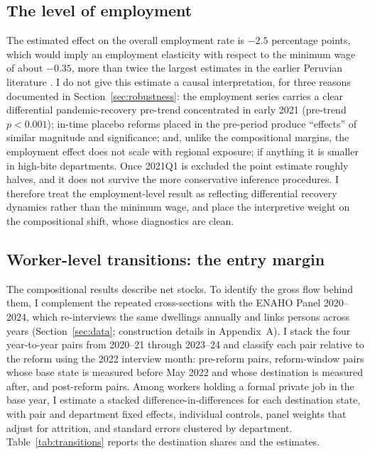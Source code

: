 \subsection{The level of employment}

The estimated effect on the overall employment rate is $-2.5$ percentage points, which
would imply an employment elasticity with respect to the minimum wage of about $-0.35$,
more than twice the largest estimates in the earlier Peruvian literature
\citep{cespedes_2005}. I do not give this estimate a causal interpretation, for three
reasons documented in Section~\ref{sec:robustness}: the employment series carries a
clear differential pandemic-recovery pre-trend concentrated in early 2021 (pre-trend
$p<0.001$); in-time placebo reforms placed in the pre-period produce ``effects'' of
similar magnitude and significance; and, unlike the compositional margins, the
employment effect does not scale with regional exposure; if anything it is smaller in
high-bite departments. Once 2021Q1 is excluded the point estimate roughly halves, and it
does not survive the more conservative inference procedures. I therefore treat the
employment-level result as reflecting differential recovery dynamics rather than the
minimum wage, and place the interpretive weight on the compositional shift, whose
diagnostics are clean.

\subsection{Worker-level transitions: the entry margin}\label{sec:transitions}

The compositional results describe net stocks. To identify the gross flow behind
them, I complement the repeated cross-sections with the ENAHO Panel 2020--2024,
which re-interviews the same dwellings annually and links persons across years
(Section~\ref{sec:data}; construction details in Appendix~A). I stack the four
year-to-year pairs from 2020--21 through 2023--24 and classify each pair relative
to the reform using the 2022 interview month: pre-reform pairs, reform-window pairs
whose base state is measured before May 2022 and whose destination is measured
after, and post-reform pairs. Among workers holding a formal private job in the
base year, I estimate a stacked difference-in-differences for each destination
state, with pair and department fixed effects, individual controls, panel weights
that adjust for attrition, and standard errors clustered by department.
Table~\ref{tab:transitions} reports the destination shares and the estimates.

